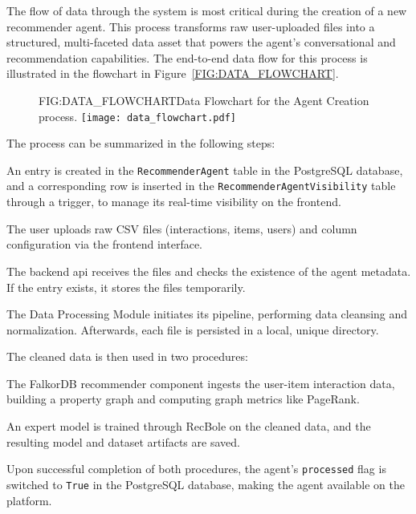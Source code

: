 The flow of data through the system is most critical during the creation of a new recommender agent. This process transforms raw user-uploaded files into a structured, multi-faceted data asset that powers the agent's conversational and recommendation capabilities. The end-to-end data flow for this process is illustrated in the flowchart in Figure~\ref{FIG:DATA_FLOWCHART}.

\begin{figure}[Data Flowchart for Agent Creation]{FIG:DATA_FLOWCHART}{Data Flowchart for the Agent Creation process.}
    \texttt{[image: data\_flowchart.pdf]}
\end{figure}

The process can be summarized in the following steps:
\begin{compactenum}
    \item An entry is created in the \texttt{RecommenderAgent} table in the PostgreSQL database, and a corresponding row is inserted in the \texttt{RecommenderAgentVisibility} table through a trigger, to manage its real-time visibility on the frontend.
    \item The user uploads raw CSV files (interactions, items, users) and column configuration via the frontend interface.
    \item The backend \acs{api} receives the files and checks the existence of the agent metadata. If the entry exists, it stores the files temporarily.
    \item The Data Processing Module initiates its pipeline, performing data cleansing and normalization. Afterwards, each file is persisted in a local, unique directory.
    \item The cleaned data is then used in two procedures:
    \begin{compactenum}
        \item The FalkorDB recommender component ingests the user-item interaction data, building a property graph and computing graph metrics like PageRank.
        \item An expert model \cite{EASER} is trained through RecBole on the cleaned data, and the resulting model and dataset artifacts are saved.
    \end{compactenum}
    \item Upon successful completion of both procedures, the agent's \texttt{processed} flag is switched to \texttt{True} in the PostgreSQL database, making the agent available on the platform.
\end{compactenum}
